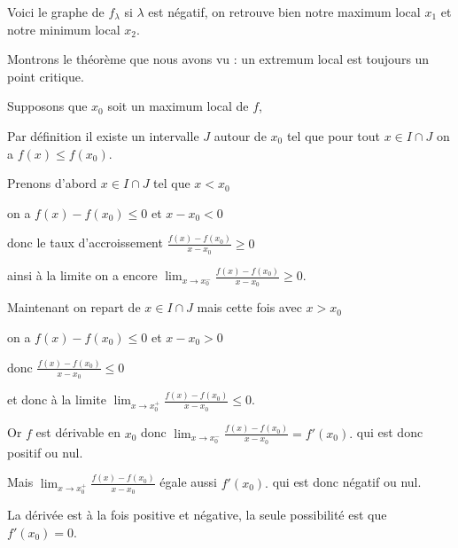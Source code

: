 \change

Voici le graphe de $f_\lambda$ si $\lambda$ est négatif,
on retrouve bien notre maximum local $x_1$ et notre minimum local $x_2$.

\diapo

Montrons le théorème que nous avons vu : un extremum local  est toujours un point critique. 

\change

Supposons que $x_0$ soit un maximum local de $f$, 

\change

Par définition il existe un intervalle $J$ autour de $x_0$
tel que pour tout $x\in I \cap J$ on a $f(x) \le f(x_0)$.

\change

Prenons d'abord  $x \in I\cap J$ tel que $x < x_0$ 


\change

on a $f(x)-f(x_0) \le 0$ et $x-x_0<0$ 

\change

donc le taux d'accroissement $\frac{f(x)-f(x_0)}{x-x_0} \ge 0$

\change

ainsi à la limite on a encore $\lim_{x \to x_0^-} \frac{f(x)-f(x_0)}{x-x_0} \ge 0$.

\change

Maintenant on repart de $x \in I\cap J$ mais cette fois avec $x > x_0$ 

\change

on a $f(x)-f(x_0) \le 0$ et $x-x_0>0$ 

\change

donc $\frac{f(x)-f(x_0)}{x-x_0} \le 0$

\change

et donc à la limite $\lim_{x \to x_0^+} \frac{f(x)-f(x_0)}{x-x_0} \le 0$.

\change

Or $f$ est dérivable en $x_0$ donc 
$\lim_{x \to x_0^-} \frac{f(x)-f(x_0)}{x-x_0} =f'(x_0).$ qui est donc positif ou nul.

\change

Mais $\lim_{x \to x_0^+} \frac{f(x)-f(x_0)}{x-x_0}$ égale aussi $f'(x_0).$
qui est donc négatif ou nul.

\change

La dérivée est à la fois positive et négative, la seule possibilité est que $f'(x_0)=0$.


\diapo

